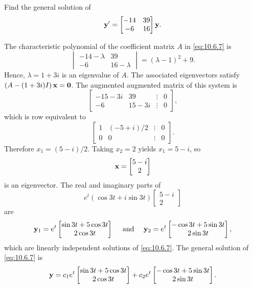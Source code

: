 \documentclass{ximera}
\begin{document}
\begin{example}\label{example:10.6.2}
 Find  the general solution of
\begin{equation} \label{eq:10.6.7}
{\bf y}'=\begin{bmatrix}-14&39\\-6&16\end{bmatrix}{\bf y}.
\end{equation}

\begin{explanation}
The characteristic polynomial of the coefficient matrix $A$
in \eqref{eq:10.6.7} is
$$
\begin{vmatrix}-14-\lambda&39\\-6&16-\lambda
\end{vmatrix}=(\lambda-1)^2+9.
$$
Hence, $\lambda=1+3i$ is an eigenvalue of $A$. The associated
eigenvectors satisfy $\left(A-(1+3i)I\right){\bf x}={\bf 0}$. The
augmented augmented matrix of this system is
$$
\begin{bmatrix}-15-3i&39&\vdots&0\\
-6&15-3i&\vdots&0  \end{bmatrix},
 $$
which is row equivalent to
$$
\begin{bmatrix}1&(-5+i)/2&\vdots&0\\ 0&0&\vdots&0
\end{bmatrix}.
$$
Therefore $x_1=(5-i)/2$. Taking $x_2=2$ yields $x_1=5-i$, so
$$
{\bf x}=\begin{bmatrix}5-i\\2\end{bmatrix}
$$
is an eigenvector. The real and imaginary parts of
$$
e^t(\cos3t+i\sin3t)\begin{bmatrix}5-i\\2\end{bmatrix}
$$
 are
$$
{\bf y}_1=e^t\begin{bmatrix}\sin3t+5\cos3t\\2\cos
3t\end{bmatrix}\quad\mbox{ and }\quad
{\bf y}_2=e^t\begin{bmatrix}-\cos3t+5\sin3t\\2\sin
3t\end{bmatrix},
 $$
which are  linearly independent solutions of  \eqref{eq:10.6.7}.
The general solution of \eqref{eq:10.6.7} is
$$
{\bf y}=c_1e^t\begin{bmatrix}\sin3t+5\cos3t\\2\cos
3t\end{bmatrix}+
c_2e^t\begin{bmatrix}-\cos3t+5\sin3t\\2\sin
3t\end{bmatrix}.
$$
\end{explanation}
\end{example}
\end{document}
